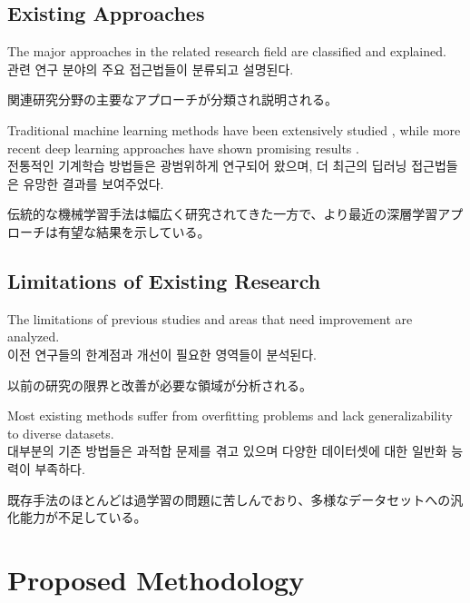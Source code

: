 \documentclass[12pt,a4paper]{article}
\begin{document}
\subsection{Existing Approaches}
The major approaches in the related research field are classified and explained. \\
관련 연구 분야의 주요 접근법들이 분류되고 설명된다. \\
\begin{CJK}{UTF8}{min}
関連研究分野の主要なアプローチが分類され説明される。
\end{CJK}

Traditional machine learning methods have been extensively studied \cite{hastie2009elements}, while more recent deep learning approaches have shown promising results \cite{schmidhuber2015deep}. \\
전통적인 기계학습 방법들은 광범위하게 연구되어 왔으며, 더 최근의 딥러닝 접근법들은 유망한 결과를 보여주었다. \\
\begin{CJK}{UTF8}{min}
伝統的な機械学習手法は幅広く研究されてきた一方で、より最近の深層学習アプローチは有望な結果を示している。
\end{CJK}

\subsection{Limitations of Existing Research}
The limitations of previous studies and areas that need improvement are analyzed. \\
이전 연구들의 한계점과 개선이 필요한 영역들이 분석된다. \\
\begin{CJK}{UTF8}{min}
以前の研究の限界と改善が必要な領域が分析される。
\end{CJK}

Most existing methods suffer from overfitting problems and lack generalizability to diverse datasets. \\
대부분의 기존 방법들은 과적합 문제를 겪고 있으며 다양한 데이터셋에 대한 일반화 능력이 부족하다. \\
\begin{CJK}{UTF8}{min}
既存手法のほとんどは過学習の問題に苦しんでおり、多様なデータセットへの汎化能力が不足している。
\end{CJK}

\section{Proposed Methodology}
\label{sec:methodology}
\end{document}
